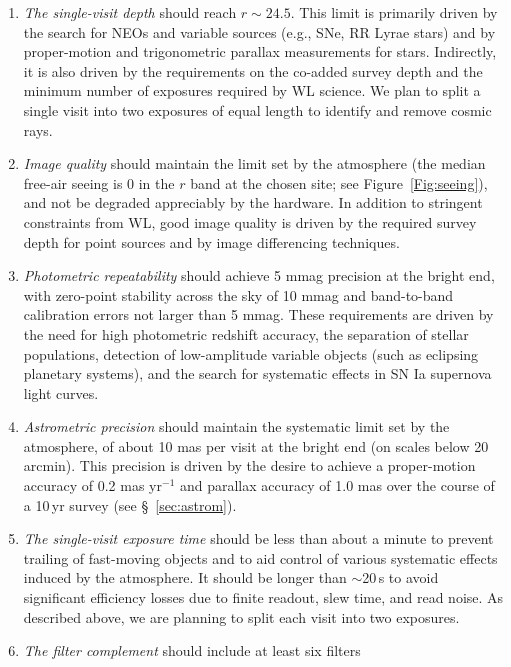 \begin{enumerate}
\item  \emph{The single-visit depth} should reach $r\sim24.5$. This limit is
   primarily driven by the search for NEOs and variable sources (e.g., SNe,
   RR Lyrae stars) and by proper-motion and trigonometric parallax
   measurements for stars. Indirectly, it is also driven by the
   requirements on the co-added survey depth and the minimum number of
   exposures required by WL science.  We plan to split a single visit
   into two exposures of equal length to identify and remove cosmic
   rays.
\item  \emph{Image quality} should maintain the limit set by the
     atmosphere (the median free-air seeing is 0 in the $r$ band
     at the chosen site; see Figure~\ref{Fig:seeing}),
     and not be degraded appreciably by the hardware. In addition to stringent
     constraints from WL, good image quality is driven by the
     required survey depth for point sources and by image differencing
     techniques.
\item  \emph{Photometric repeatability} should achieve 5 mmag precision
     at the bright end, with zero-point stability across the sky of 10 mmag
     and band-to-band calibration errors not larger than 5 mmag.
     These requirements are driven by the need for high photometric redshift accuracy,
     the separation of stellar populations, detection of low-amplitude variable
     objects (such as eclipsing planetary systems), and the search for
     systematic effects in SN Ia supernova light curves.
\item  \emph{Astrometric precision} should maintain the systematic limit set by
     the atmosphere, of about 10 mas per visit at the bright end
     (on scales below 20 arcmin). This precision is driven by the desire to
     achieve a proper-motion accuracy of 0.2 mas yr$^{-1}$ and parallax accuracy of
     1.0 mas over the course of a 10\,yr survey (see \S~\ref{sec:astrom}).
\item  \emph{The single-visit exposure time}
should be less than about a minute
    to prevent trailing of fast-moving objects and to aid control
    of various systematic effects induced by the atmosphere. It should
    be longer than $\sim$20\,s to avoid significant efficiency losses due to
    finite readout, slew time, and read noise.  As described above, we
    are planning to split each visit into two exposures.
\item  \emph{The filter complement} should include at least six filters

\end{enumerate}
